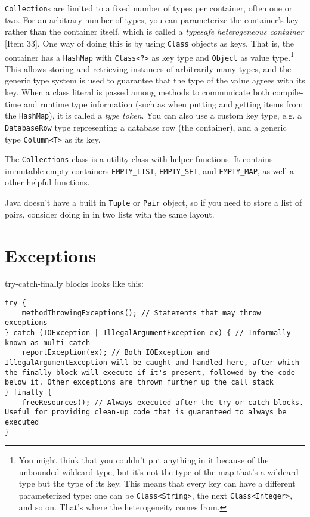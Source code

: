 \documentclass[8pt, table, xcdraw]{article}%
\begin{document}
\lstinline{Collection}s are limited to a fixed number of types per container, often one or two. For an arbitrary number of types, you can parameterize the container's key rather than the container itself, which is called a \emph{typesafe heterogeneous container} [Item 33]. One way of doing this is by using \lstinline{Class} objects as keys. That is, the container has a \lstinline{HashMap} with \lstinline{Class<?>} as key type and \lstinline{Object} as value type.\footnote{You might think that you couldn't put anything in it because of the unbounded wildcard type, but it's not the type of the map that's a wildcard type but the type of its key. This means that every key can have a different parameterized type: one can be \lstinline{Class<String>}, the next \lstinline{Class<Integer>}, and so on. That's where the heterogeneity comes from.} This allows storing and retrieving instances of arbitrarily many types, and the generic type system is used to guarantee that the type of the value agrees with its key. When a class literal is passed among methods to communicate both compile-time and runtime type information (such as when putting and getting items from the \lstinline{HashMap}), it is called a \emph{type token}. You can also use a custom key type, e.g. a \lstinline{DatabaseRow} type representing a database row (the container), and a generic type \lstinline{Column<T>} as its key.

The \lstinline{Collections} class is a utility class with helper functions. It contains immutable empty containers \lstinline{EMPTY_LIST}, \lstinline{EMPTY_SET}, and \lstinline{EMPTY_MAP}, as well a other helpful functions.

Java doesn't have a built in \lstinline{Tuple} or \lstinline{Pair} object, so if you need to store a list of pairs, consider doing in in two lists with the same layout.

\section{Exceptions}

try-catch-finally blocks looks like this:

\begin{lstlisting}
try {
    methodThrowingExceptions(); // Statements that may throw exceptions
} catch (IOException | IllegalArgumentException ex) { // Informally known as multi-catch
    reportException(ex); // Both IOException and IllegalArgumentException will be caught and handled here, after which the finally-block will execute if it's present, followed by the code below it. Other exceptions are thrown further up the call stack
} finally {
    freeResources(); // Always executed after the try or catch blocks. Useful for providing clean-up code that is guaranteed to always be executed
}
\end{lstlisting}
\end{document}
